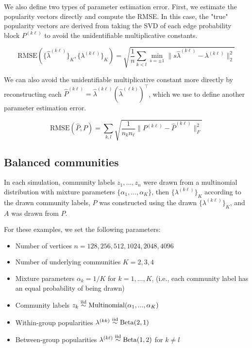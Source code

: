 \documentclass[12pt]{article}
\providecommand{\tightlist}{%
  \setlength{\itemsep}{0pt}\setlength{\parskip}{0pt}}
\begin{document}
We also define two types of parameter estimation error. 
First, we estimate the popularity vectors directly and compute the RMSE. 
In this case, the "true" popularity vectors are derived from 
taking the SVD of each edge probability block $P^{(k \ell)}$ 
to avoid the unidentifiable multiplicative constants. 

\[\text{RMSE}(\{\hat{\lambda}^{(k \ell)}\}_K, \{\lambda^{(k \ell)}\}_K) = 
\sqrt{\frac{1}{n} \sum_{k < l} \min_{s = \pm 1} 
\|s \hat{\lambda}^{(k \ell)} - \lambda^{(k \ell)} \|_2^2}\]

We can also avoid the unidentifiable multiplicative constant more directly 
by reconstructing each 
$\hat{P}^{(k \ell)} = \hat{\lambda}^{(k \ell)} (\hat{\lambda}^{(\ell k)})^\top$, 
which we use to define another parameter estimation error. 

\[\text{RMSE}(\hat{P}, P) =
\sum_{k,l} \sqrt{\frac{1}{n_k n_\ell} \|P^{(k \ell)} - \hat{P}^{(k \ell)}\|_F^2}\]

\hypertarget{balanced-communities}{%
\subsection{Balanced communities}\label{balanced-communities}}

In each simulation, community labels \(z_1, ..., z_n\) were drawn from a
multinomial distribution with mixture parameters
\(\{\alpha_1, ..., \alpha_K\}\), then \(\{\lambda^{(k \ell)}\}_K\) according
to the drawn community labels, \(P\) was constructed using the drawn
\(\{\lambda^{(k \ell)}\}_K\), and \(A\) was drawn from \(P\).

For these examples, we set the following parameters:

\begin{itemize}
\tightlist
\item
  Number of vertices \(n = 128, 256, 512, 1024, 2048, 4096\)
\item
  Number of underlying communities \(K = 2, 3, 4\)
\item
  Mixture parameters \(\alpha_k = 1 / K\) for \(k = 1, ..., K\), (i.e.,
  each community label has an equal probability of being drawn)
\item
  Community labels
  \(z_k \stackrel{\text{iid}}{\sim} \mathrm{Multinomial}(\alpha_1, ..., \alpha_K)\)
\item
  Within-group popularities
  \(\lambda^{(kk)} \stackrel{\text{iid}}{\sim} \mathrm{Beta}(2, 1)\)
\item
  Between-group popularities
  \(\lambda^{(k \ell)} \stackrel{\text{iid}}{\sim} \mathrm{Beta}(1, 2)\) for
  \(k \neq l\)
\end{itemize}
\end{document}
